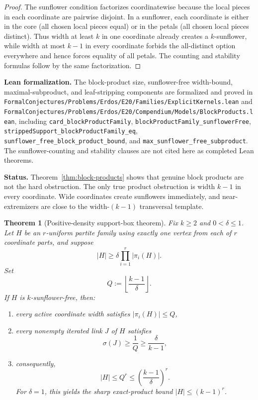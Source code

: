 \documentclass[11pt]{article}
\newtheorem{theorem}{Theorem}[section]
\theoremstyle{definition}
\newcommand{\1}{\mathbf{1}}
\newcommand{\status}[1]{\par\smallskip\noindent\textbf{Status.} #1\par\smallskip}
\newcommand{\leannote}[1]{\par\smallskip\noindent\textbf{Lean formalization.} #1\par\smallskip}
\begin{document}
\begin{proof}
The sunflower condition factorizes coordinatewise because the local pieces in each coordinate are pairwise disjoint. In a sunflower, each coordinate is either in the core (all chosen local pieces equal) or in the petals (all chosen local pieces distinct). Thus width at least $k$ in one coordinate already creates a $k$-sunflower, while width at most $k-1$ in every coordinate forbids the all-distinct option everywhere and hence forces equality of all petals. The counting and stability formulas follow by the same factorization.
\end{proof}

\leannote{The block-product size, sunflower-free width-bound, maximal-subproduct, and leaf-stripping components are formalized and proved in \texttt{FormalConjectures/Problems/Erdos/E20/Families/ExplicitKernels.lean} and \texttt{FormalConjectures/Problems/Erdos/E20/Compendium/Models/BlockProducts.lean}, including \texttt{card\_blockProductFamily}, \texttt{blockProductFamily\_sunflowerFree}, \texttt{strippedSupport\_blockProductFamily\_eq}, \texttt{sunflower\_free\_block\_product\_bound}, and \texttt{max\_sunflower\_free\_subproduct}. The sunflower-counting and stability clauses are not cited here as completed Lean theorems.}

\status{Theorem~\ref{thm:block-products} shows that genuine block products are not the hard obstruction. The only true product obstruction is width $k-1$ in every coordinate. Wide coordinates create sunflowers immediately, and near-extremizers are close to the width-$(k-1)$ transversal template.}

\begin{theorem}[Positive-density support-box theorem]\label{thm:positive-density-box}
Fix $k\ge 2$ and $0<\delta\le 1$. Let $H$ be an $r$-uniform partite family using exactly one vertex from each of $r$ coordinate parts, and suppose
\[
|H|\ge \delta \prod_{i=1}^r |\pi_i(H)|.
\]
Set
\[
Q:=\left\lfloor \frac{k-1}{\delta}\right\rfloor.
\]
If $H$ is $k$-sunflower-free, then:
\begin{enumerate}[label=(\roman*),leftmargin=2.2em]
\item every active coordinate width satisfies $|\pi_i(H)|\le Q$,
\item every nonempty iterated link $J$ of $H$ satisfies
\[
\sigma(J)\ge \frac{1}{Q}\ge \frac{\delta}{k-1},
\]
\item consequently,
\[
|H|\le Q^r\le \left(\frac{k-1}{\delta}\right)^r.
\]
For $\delta=1$, this yields the sharp exact-product bound $|H|\le (k-1)^r$.
\end{enumerate}
\end{theorem}
\end{document}

